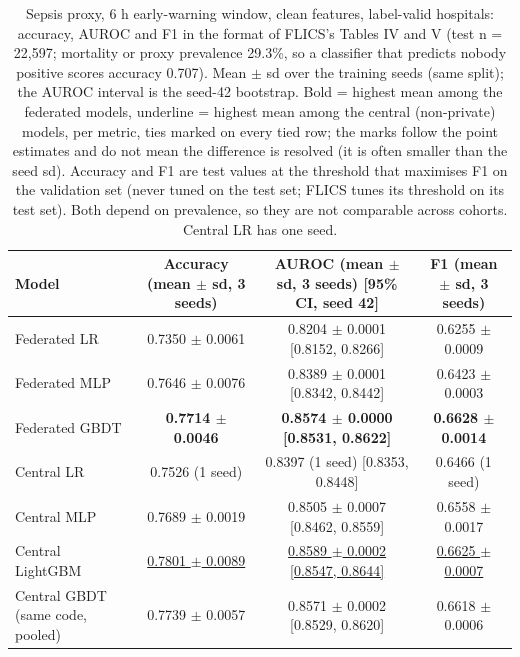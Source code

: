 \begin{table}[t]
\centering\small
\caption{Sepsis proxy, 6 h early-warning window, clean features, label-valid hospitals: accuracy, AUROC and F1 in the format of FLICS's Tables IV and V (test n = 22,597; mortality or proxy prevalence 29.3\%, so a classifier that predicts nobody positive scores accuracy 0.707). Mean $\pm$ sd over the training seeds (same split); the AUROC interval is the seed-42 bootstrap. Bold = highest mean among the federated models, underline = highest mean among the central (non-private) models, per metric, ties marked on every tied row; the marks follow the point estimates and do not mean the difference is resolved (it is often smaller than the seed sd). Accuracy and F1 are test values at the threshold that maximises F1 on the validation set (never tuned on the test set; FLICS tunes its threshold on its test set). Both depend on prevalence, so they are not comparable across cohorts. Central LR has one seed.}\label{tab:final_sepsis6h}
\begin{tabular}{lccc}
\toprule
Model & Accuracy (mean $\pm$ sd, 3 seeds) & AUROC (mean $\pm$ sd, 3 seeds) [95\% CI, seed 42] & F1 (mean $\pm$ sd, 3 seeds) \\
\midrule
Federated LR & 0.7350 $\pm$ 0.0061 & 0.8204 $\pm$ 0.0001 [0.8152, 0.8266] & 0.6255 $\pm$ 0.0009 \\
Federated MLP & 0.7646 $\pm$ 0.0076 & 0.8389 $\pm$ 0.0001 [0.8342, 0.8442] & 0.6423 $\pm$ 0.0003 \\
Federated GBDT & \textbf{0.7714 $\pm$ 0.0046} & \textbf{0.8574 $\pm$ 0.0000 [0.8531, 0.8622]} & \textbf{0.6628 $\pm$ 0.0014} \\
Central LR & 0.7526 (1 seed) & 0.8397 (1 seed) [0.8353, 0.8448] & 0.6466 (1 seed) \\
Central MLP & 0.7689 $\pm$ 0.0019 & 0.8505 $\pm$ 0.0007 [0.8462, 0.8559] & 0.6558 $\pm$ 0.0017 \\
Central LightGBM & \underline{0.7801 $\pm$ 0.0089} & \underline{0.8589 $\pm$ 0.0002 [0.8547, 0.8644]} & \underline{0.6625 $\pm$ 0.0007} \\
Central GBDT (same code, pooled) & 0.7739 $\pm$ 0.0057 & 0.8571 $\pm$ 0.0002 [0.8529, 0.8620] & 0.6618 $\pm$ 0.0006 \\
\bottomrule
\end{tabular}
\end{table}
